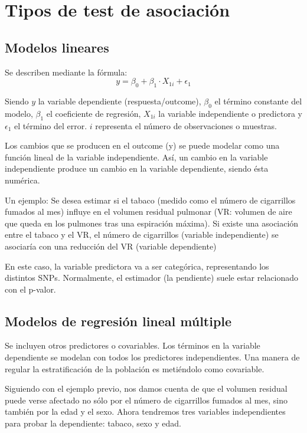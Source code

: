 \section{Tipos de test de asociación}
\subsection{Modelos lineares}
Se describen mediante la fórmula:
$$y = \beta_0 + \beta_1 \cdot X_{1i} + \epsilon_1$$

Siendo $y$ la variable dependiente (respuesta/outcome), $\beta_0$ el término constante del modelo, $\beta_1$ el coeficiente de regresión, $X_{1i}$ la variable independiente o predictora y $\epsilon_1$ el término del error. $i$ representa el número de observaciones o muestras.

Los cambios que se producen en el outcome (y) se puede modelar como una función lineal de la variable independiente. Así, un cambio en la variable independiente produce un cambio en la variable dependiente, siendo ésta numérica. 

Un ejemplo: Se desea estimar si el tabaco (medido como el número de cigarrillos fumados al mes) influye en el volumen residual pulmonar (VR: volumen de aire que queda en los pulmones tras una espiración máxima). Si existe una asociación entre el tabaco y el VR, el número de cigarrillos (variable independiente) se asociaría con una reducción del VR (variable dependiente)

En este caso, la variable predictora va a ser categórica, representando los distintos SNPs. Normalmente, el estimador (la pendiente) suele estar relacionado con el p-valor. 

\subsection{Modelos de regresión lineal múltiple}
Se incluyen otros predictores o covariables. Los términos en la variable dependiente se modelan con todos los predictores independientes. Una manera de regular la estratificación de la población es metiéndolo como covariable.

Siguiendo con el ejemplo previo, nos damos cuenta de que el volumen residual puede verse afectado no sólo por el número de cigarrillos fumados al mes, sino también por la edad y el sexo. Ahora tendremos tres variables independientes para probar la dependiente: tabaco, sexo y edad.

